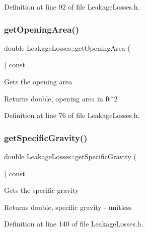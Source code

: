 Definition at line 92 of file Leakage\+Losses.\+h.

\mbox{\label{class_leakage_losses_a6b31fbefaa16a5a52ce423b9531e84fa}} 
\subsubsection{\texorpdfstring{get\+Opening\+Area()}{getOpeningArea()}}
{\footnotesize\ttfamily double Leakage\+Losses\+::get\+Opening\+Area (\begin{DoxyParamCaption}{ }\end{DoxyParamCaption}) const\hspace{0.3cm}{\ttfamily [inline]}}

Gets the opening area \begin{DoxyReturn}{Returns}
double, opening area in ft$^\wedge$2 
\end{DoxyReturn}


Definition at line 76 of file Leakage\+Losses.\+h.

\mbox{\label{class_leakage_losses_a37cd8c2282547246bab395424dad51d9}} 
\subsubsection{\texorpdfstring{get\+Specific\+Gravity()}{getSpecificGravity()}}
{\footnotesize\ttfamily double Leakage\+Losses\+::get\+Specific\+Gravity (\begin{DoxyParamCaption}{ }\end{DoxyParamCaption}) const\hspace{0.3cm}{\ttfamily [inline]}}

Gets the specific gravity \begin{DoxyReturn}{Returns}
double, specific gravity -\/ unitless 
\end{DoxyReturn}


Definition at line 140 of file Leakage\+Losses.\+h.

\mbox{\label{class_leakage_losses_aa6028111b3eb305d9ea6f9efea7c6c66}} 
